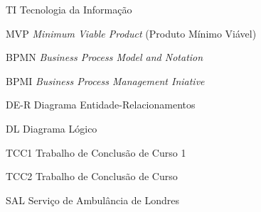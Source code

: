 \begin{siglas}
  \item[TI] Tecnologia da Informação
  \item[MVP] \textit{Minimum Viable Product} (Produto Mínimo Viável)
  \item[BPMN] \textit{Business Process Model and Notation}
  \item[BPMI] \textit{Business Process Management Iniative}
  \item[DE-R] Diagrama Entidade-Relacionamentos
  \item[DL] Diagrama Lógico
  \item[TCC1] Trabalho de Conclusão de Curso 1
  \item[TCC2] Trabalho de Conclusão de Curso 
  \item[SAL] Serviço de Ambulância de Londres
\end{siglas}